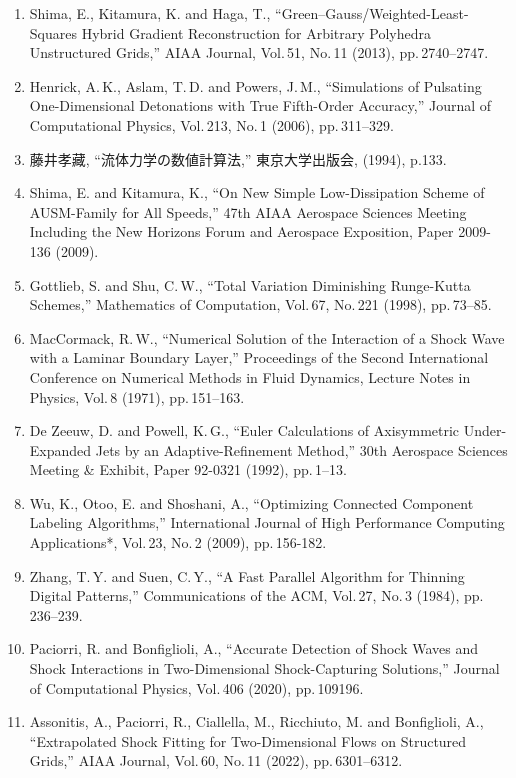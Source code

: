 \documentclass[a4j]{jarticle}
\begin{document}
\begin{enumerate}
  \item Shima, E., Kitamura, K. and Haga, T., ``Green–Gauss/Weighted-Least-Squares Hybrid Gradient Reconstruction for Arbitrary Polyhedra Unstructured Grids,'' 
  AIAA Journal, Vol.\,51, No.\,11 (2013), pp.\,2740--2747.
  \label{ref:gg}

  \item Henrick, A.\,K., Aslam, T.\,D. and Powers, J.\,M., ``Simulations of Pulsating One-Dimensional Detonations with True Fifth-Order Accuracy,'' 
  Journal of Computational Physics, Vol.\,213, No.\,1 (2006), pp.\,311--329.
  \label{ref:MUSCL}

  \item 藤井孝藏, ``流体力学の数値計算法,'' 東京大学出版会, (1994), p.133.
  \label{ref:fuji}

  \item Shima, E. and Kitamura, K., ``On New Simple Low-Dissipation Scheme of AUSM-Family for All Speeds,'' 
  47th AIAA Aerospace Sciences Meeting Including the New Horizons Forum and Aerospace Exposition, Paper 2009-136 (2009).
  \label{ref:SLAU}

  \item Gottlieb, S. and Shu, C.\,W., ``Total Variation Diminishing Runge-Kutta Schemes,'' 
  Mathematics of Computation, Vol.\,67, No.\,221 (1998), pp.\,73–85.  
  \label{ref:TVDrk3}

  \item MacCormack, R.\,W., ``Numerical Solution of the Interaction of a Shock Wave with a Laminar Boundary Layer,'' 
  Proceedings of the Second International Conference on Numerical Methods in Fluid Dynamics, Lecture Notes in Physics, Vol.\,8 (1971), pp.\,151–163.  
  \label{ref:CFL}

  \item De Zeeuw, D. and Powell, K.\,G., ``Euler Calculations of Axisymmetric Under-Expanded Jets by an Adaptive-Refinement Method,'' 
  30th Aerospace Sciences Meeting \& Exhibit, Paper 92-0321 (1992), pp.\,1--13.
  \label{ref:AMR}

  \item Wu, K., Otoo, E. and Shoshani, A., ``Optimizing Connected Component Labeling Algorithms,'' 
  International Journal of High Performance Computing Applications*, Vol.\,23, No.\,2 (2009), pp.\,156-182.  
  \label{ref:CCL}

  \item Zhang, T.\,Y. and Suen, C.\,Y., ``A Fast Parallel Algorithm for Thinning Digital Patterns,'' 
  Communications of the ACM, Vol.\,27, No.\,3 (1984), pp.\,236--239.
  \label{ref:skelton}

  \item Paciorri, R. and Bonfiglioli, A., ``Accurate Detection of Shock Waves and Shock Interactions in Two-Dimensional Shock-Capturing Solutions,'' 
  Journal of Computational Physics, Vol.\,406 (2020), pp.\,109196.
  \label{ref:intera}

  \item Assonitis, A., Paciorri, R., Ciallella, M., Ricchiuto, M. and Bonfiglioli, A., ``Extrapolated Shock Fitting for Two-Dimensional Flows on Structured Grids,'' 
  AIAA Journal, Vol.\,60, No.\,11 (2022), pp.\,6301--6312.
  \label{ref:SF}
\end{enumerate}
\end{document}

